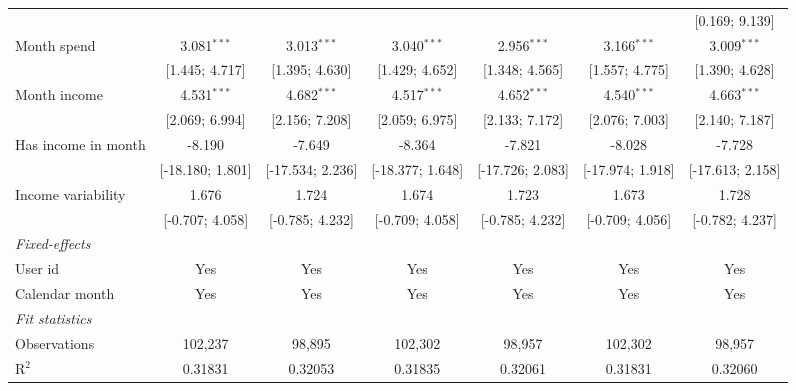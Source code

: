 \begin{table}[htbp]
\begin{threeparttable}[b]
\begin{tabular}{lcccccc}
                                         &                  &                  &                  &                  &                  & [0.169; 9.139]\\   
         Month spend                     & 3.081$^{***}$    & 3.013$^{***}$    & 3.040$^{***}$    & 2.956$^{***}$    & 3.166$^{***}$    & 3.009$^{***}$\\   
                                         & [1.445; 4.717]   & [1.395; 4.630]   & [1.429; 4.652]   & [1.348; 4.565]   & [1.557; 4.775]   & [1.390; 4.628]\\   
         Month income                    & 4.531$^{***}$    & 4.682$^{***}$    & 4.517$^{***}$    & 4.652$^{***}$    & 4.540$^{***}$    & 4.663$^{***}$\\   
                                         & [2.069; 6.994]   & [2.156; 7.208]   & [2.059; 6.975]   & [2.133; 7.172]   & [2.076; 7.003]   & [2.140; 7.187]\\   
         Has income in month             & -8.190           & -7.649           & -8.364           & -7.821           & -8.028           & -7.728\\   
                                         & [-18.180; 1.801] & [-17.534; 2.236] & [-18.377; 1.648] & [-17.726; 2.083] & [-17.974; 1.918] & [-17.613; 2.158]\\   
         Income variability              & 1.676            & 1.724            & 1.674            & 1.723            & 1.673            & 1.728\\   
                                         & [-0.707; 4.058]  & [-0.785; 4.232]  & [-0.709; 4.058]  & [-0.785; 4.232]  & [-0.709; 4.056]  & [-0.782; 4.237]\\   
         \midrule
         \emph{Fixed-effects}\\
         User id                         & Yes              & Yes              & Yes              & Yes              & Yes              & Yes\\  
         Calendar month                  & Yes              & Yes              & Yes              & Yes              & Yes              & Yes\\  
         \midrule
         \emph{Fit statistics}\\
         Observations                    & 102,237          & 98,895           & 102,302          & 98,957           & 102,302          & 98,957\\  
         R$^2$                           & 0.31831          & 0.32053          & 0.31835          & 0.32061          & 0.31831          & 0.32060\\  

\end{tabular}
\end{threeparttable}
\end{table}
